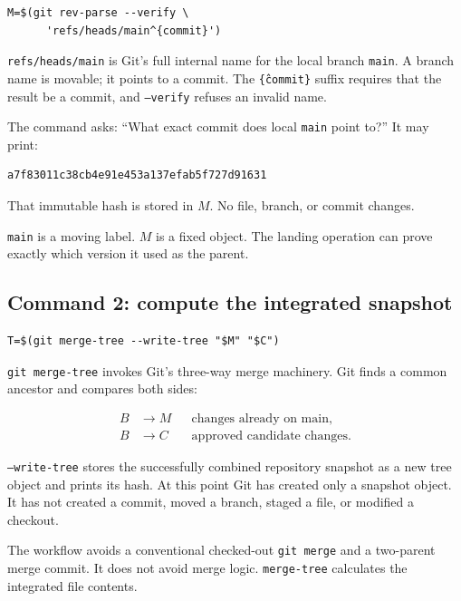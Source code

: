 \documentclass[10pt,twocolumn]{article}
\newcommand{\code}[1]{\texttt{#1}}
\begin{document}
\begin{lstlisting}
M=$(git rev-parse --verify \
      'refs/heads/main^{commit}')
\end{lstlisting}

\code{refs/heads/main} is Git's full internal name for the local branch
\code{main}. A branch name is movable; it points to a commit. The
\code{\^\{commit\}} suffix requires that the result be a commit, and
\code{--verify} refuses an invalid name.

The command asks: ``What exact commit does local \code{main} point to?'' It
may print:

\begin{lstlisting}
a7f83011c38cb4e91e453a137efab5f727d91631
\end{lstlisting}

That immutable hash is stored in $M$. No file, branch, or commit changes.

\begin{keybox}
\code{main} is a moving label. $M$ is a fixed object. The landing operation
can prove exactly which version it used as the parent.
\end{keybox}

\subsection{Command 2: compute the integrated snapshot}

\begin{lstlisting}
T=$(git merge-tree --write-tree "$M" "$C")
\end{lstlisting}

\code{git merge-tree} invokes Git's three-way merge machinery. Git finds a
common ancestor and compares both sides:

\begin{align*}
B &\rightarrow M && \text{changes already on main},\\
B &\rightarrow C && \text{approved candidate changes}.
\end{align*}

\code{--write-tree} stores the successfully combined repository snapshot as
a new tree object and prints its hash. At this point Git has created only a
snapshot object. It has not created a commit, moved a branch, staged a file,
or modified a checkout.

\begin{warningbox}
The workflow avoids a conventional checked-out \code{git merge} and a
two-parent merge commit. It does not avoid merge logic. \code{merge-tree}
calculates the integrated file contents.
\end{warningbox}
\end{document}
